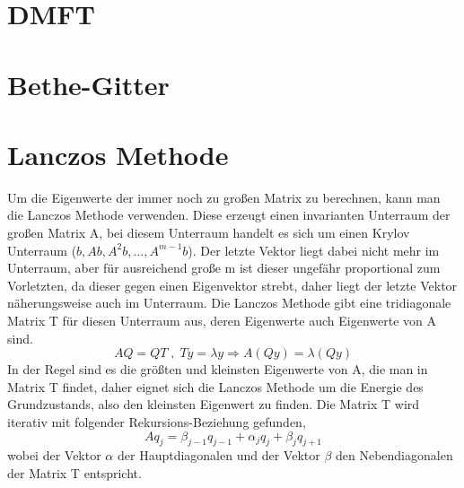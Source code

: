 \section{DMFT}


\section{Bethe-Gitter}

\section{Lanczos Methode}
Um die Eigenwerte der immer noch zu großen Matrix zu berechnen, kann man die Lanczos Methode verwenden. Diese erzeugt einen invarianten Unterraum der großen Matrix A, bei diesem Unterraum handelt es sich um einen Krylov Unterraum ($b,Ab,A^2b,...,A^{m-1}b$). Der letzte Vektor liegt dabei nicht mehr im Unterraum, aber für ausreichend große m  ist dieser ungefähr proportional zum Vorletzten, da dieser gegen einen Eigenvektor strebt, daher liegt der letzte Vektor näherungsweise auch im Unterraum. Die Lanczos Methode gibt eine tridiagonale Matrix T für diesen Unterraum aus, deren Eigenwerte auch Eigenwerte von A sind.\cite{Lin, FZJ}
\begin{equation}
AQ = QT\;,\;Ty=\lambda y \Rightarrow A(Qy)=\lambda(Qy)
\end{equation} 
In der Regel sind es die größten und kleinsten Eigenwerte von A, die man in Matrix T findet, daher eignet sich die Lanczos Methode um die Energie des Grundzustands, also den kleinsten Eigenwert zu finden. Die Matrix T wird iterativ mit folgender Rekursions-Beziehung gefunden, 
\begin{equation}
Aq_j = \beta_{j-1}q_{j-1}+\alpha_jq_j+\beta_{j}q_{j+1}
\end{equation}
wobei der Vektor $\alpha$ der Hauptdiagonalen und der Vektor $\beta$ den Nebendiagonalen der Matrix T entspricht.\cite{Lloyd}








